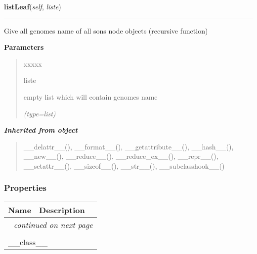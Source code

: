 \hspace{.8\funcindent}\begin{boxedminipage}{\funcwidth}

    \raggedright \textbf{listLeaf}(\textit{self}, \textit{liste})

    \vspace{-1.5ex}

    \rule{\textwidth}{0.5\fboxrule}
\setlength{\parskip}{2ex}
    Give all genomes name of all sons node objects (recursive function)

\setlength{\parskip}{1ex}
      \textbf{Parameters}
      \vspace{-1ex}

      \begin{quote}
        \begin{Ventry}{xxxxx}

          \item[liste]

          empty list which will contain genomes name

            {\it (type=list)}

        \end{Ventry}

      \end{quote}

    \end{boxedminipage}


\large{\textbf{\textit{Inherited from object}}}

\begin{quote}
\_\_delattr\_\_(), \_\_format\_\_(), \_\_getattribute\_\_(), \_\_hash\_\_(), \_\_new\_\_(), \_\_reduce\_\_(), \_\_reduce\_ex\_\_(), \_\_repr\_\_(), \_\_setattr\_\_(), \_\_sizeof\_\_(), \_\_str\_\_(), \_\_subclasshook\_\_()
\end{quote}


  \subsubsection{Properties}

    \vspace{-1cm}
\hspace{\varindent}\begin{longtable}{|p{\varnamewidth}|p{\vardescrwidth}|l}
\cline{1-2}
\cline{1-2} \centering \textbf{Name} & \centering \textbf{Description}& \\
\cline{1-2}
\endhead\cline{1-2}\multicolumn{3}{r}{\small\textit{continued on next page}}\\\endfoot\cline{1-2}
\endlastfoot\multicolumn{2}{|l|}{\textit{Inherited from object}}\\
\multicolumn{2}{|p{\varwidth}|}{\raggedright \_\_class\_\_}\\
\cline{1-2}
\end{longtable}

